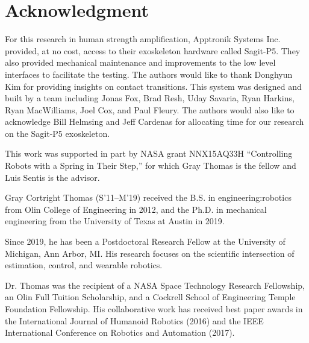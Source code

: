 \documentclass{ieeeaccess}
\newcommand*{\ta}[1]{#1}
\begin{document}




\section*{Acknowledgment}
	For this research in human strength amplification, Apptronik Systems Inc. provided, at no cost, access to their exoskeleton hardware called Sagit-P5. They also provided mechanical maintenance and improvements to the low level interfaces to facilitate the testing. The authors would like to thank Donghyun Kim for providing insights on contact transitions. This system was designed and built by a team including Jonas Fox, Brad Resh, Uday Savaria, Ryan Harkins, Ryan MacWilliams, Joel Cox, and Paul Fleury. The authors would also like to acknowledge Bill Helmsing and Jeff Cardenas for allocating time for our research on the Sagit-P5 exoskeleton.
	
	This work was \ta{supported} in part by NASA grant NNX15AQ33H ``Controlling Robots with a Spring in Their Step,'' for which Gray Thomas is the fellow and Luis Sentis is the advisor.





\begin{IEEEbiography}{Gray Cortright Thomas} (S'11--M'19) received the B.S. in engineering:robotics from Olin College of Engineering in 2012, and the Ph.D. in mechanical engineering from the University of Texas at Austin in 2019. 
	
Since 2019, he has been a Postdoctoral Research Fellow at the University of Michigan, Ann Arbor, MI. His research focuses on the scientific intersection of estimation, control, and wearable robotics.

Dr. Thomas was the recipient of a NASA Space Technology Research Fellowship, an Olin Full Tuition Scholarship, and a Cockrell School of Engineering Temple Foundation Fellowship. His collaborative work has received best paper awards in the International Journal of Humanoid Robotics (2016) and the IEEE International Conference on Robotics and Automation (2017).

\end{IEEEbiography}
\end{document}
